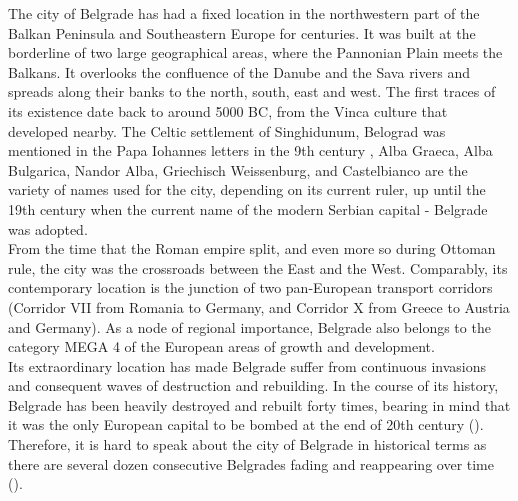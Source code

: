 \documentclass[11pt]{report}
\begin{document}
{{{{The city of Belgrade has had a fixed location in the northwestern part of the Balkan Peninsula and Southeastern Europe for centuries. It was built at the borderline of two large geographical areas, where the Pannonian Plain meets the Balkans. It overlooks the confluence of the Danube and the Sava rivers and spreads along their banks to the north, south, east and west. The first traces of its existence date back to around 5000 BC, from the Vinca culture that developed nearby. The Celtic settlement of Singhidunum, Belograd was mentioned in the Papa Iohannes letters in the 9th century , Alba Graeca, Alba Bulgarica, Nandor Alba, Griechisch Weissenburg, and Castelbianco are the variety of names used for the city, depending on its current ruler, up until the 19th century when the current name of the modern Serbian capital - Belgrade was adopted. 
\\

From the time that the Roman empire split, and even more so during Ottoman rule, the city was the crossroads between the East and the West. Comparably, its contemporary location is the junction of two pan-European transport corridors (Corridor VII from Romania to Germany, and Corridor X from Greece to Austria and Germany). As a node of regional importance, Belgrade also belongs to the category MEGA 4 of the European areas of growth and development.
\\

Its extraordinary location has made Belgrade suffer from continuous invasions and consequent waves of destruction and rebuilding. In the course of its history, Belgrade has been heavily destroyed and rebuilt forty times, bearing in mind that it was the only European capital to be bombed at the end of 20th century (\href{Doytchinov}{\citealt{doytchinov_belgrade_2015}}). Therefore, it is hard to speak about the city of Belgrade in historical terms as there are several dozen consecutive Belgrades fading and reappearing over time (\href{Grozdanic}{\citealt{grozdanic_belgrade_2008}}).
\\

}}}}
\end{document}
